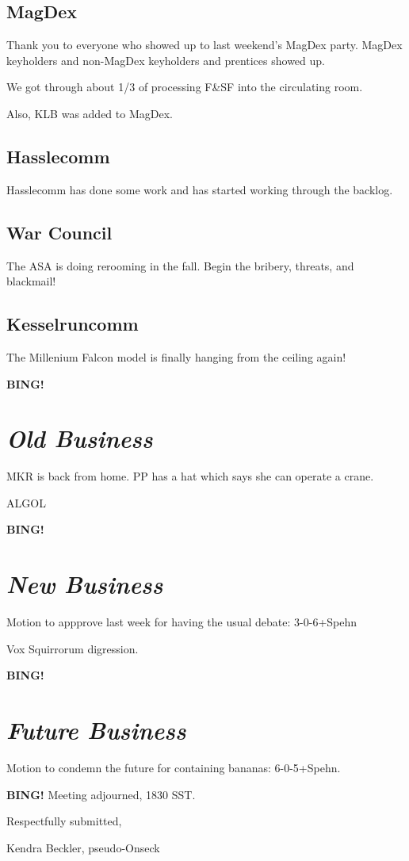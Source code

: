 \documentclass[10pt]{article}
\newcommand{\bing}{{\bf BING!} }
\newcommand{\goto}[1]{\bing \vskip 12pt \section*{{\em{#1}}}}
\begin{document}
\subsection*{MagDex}

Thank you to everyone who showed up to last weekend's MagDex party.  MagDex keyholders and non-MagDex keyholders and prentices showed up.

We got through about 1/3 of processing F&SF into the circulating room.

Also, KLB was added to MagDex.

\subsection*{Hasslecomm}

Hasslecomm has done some work and has started working through the backlog.

\subsection*{War Council}

The ASA is doing rerooming in the fall.  Begin the bribery, threats, and blackmail!

\subsection*{Kesselruncomm}

The Millenium Falcon model is finally hanging from the ceiling again!

\goto{Old Business}

MKR is back from home.  PP has a hat which says she can operate a crane.

ALGOL

\goto{New Business}

Motion to appprove last week for having the usual debate: 3-0-6+Spehn

Vox Squirrorum digression.

\goto{Future Business}

Motion to condemn the future for containing bananas: 6-0-5+Spehn.

\bing
\noindent
Meeting adjourned, 1830 SST.

\vspace{18pt}

\centerline{Respectfully submitted,}
\centerline{Kendra Beckler, pseudo-Onseck}
\end{document}
